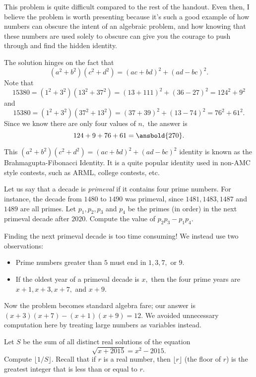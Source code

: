 \documentclass[mast]{lucky}
\begin{document}
This problem is quite difficult compared to the rest of the handout. Even then, I believe the problem is worth presenting because it's such a good example of how numbers can obscure the intent of an algebraic problem, and how knowing that these numbers are used solely to obscure can give you the courage to push through and find the hidden identity.

\begin{sol}
The solution hinges on the fact that
\[(a^2+b^2)(c^2+d^2)=(ac+bd)^2+(ad-bc)^2.\]
Note that
\[15380=(1^2+3^2)(13^2+37^2)=(13+111)^2+(36-27)^2=124^2+9^2\]
and
\[15380=(1^2+3^2)(37^2+13^2)=(37+39)^2+(13-74)^2=76^2+61^2.\]
Since we know there are only four values of $n,$ the answer is
\[124+9+76+61=\ansbold{270}.\]
\end{sol}

This $(a^2+b^2)(c^2+d^2)=(ac+bd)^2+(ad-bc)^2$ identity is known as the Brahmagupta-Fibonacci Identity. It is a quite popular identity used in non-AMC style contests, such as ARML, college contests, etc.

\begin{exam}[2017-2018 Mandelbrot]
Let us say that a decade is \emph{primeval} if it contains four prime numbers. For instance, the decade from $1480$ to $1490$ was primeval, since $1481, 1483, 1487$ and $1489$ are all primes. Let $p_1,p _2, p_3$ and $p_4$ be the primes (in order) in the  next primeval decade after $2020.$ Compute the value of $p_2 p_3-p_1 p_4$.
\end{exam}

\begin{sol}
Finding the next primeval decade is too time consuming! We instead use two observations:
\begin{itemize}
\item Prime numbers greater than $5$ must end in $1,3,7,$ or $9.$
\item If the oldest year of a primeval decade is $x,$ then the four prime years are $x+1,x+3,x+7,$ and $x+9.$
\end{itemize}
Now the problem becomes standard algebra fare; our answer is $(x+3)(x+7)-(x+1)(x+9) = 12.$ We avoided unnecessary computation here by treating large numbers as variables instead.
\end{sol}

\begin{exam}{6}
Let $S$ be the sum of all distinct real solutions of the equation 
\[\sqrt{x + 2015} = x^2 - 2015.\]
Compute $\lfloor 1/S \rfloor$.  Recall that if $r$ is a real number, then $\lfloor r \rfloor$ (the floor of $r$) is the greatest integer that is less than or equal to $r$.
\end{exam}
\end{document}
